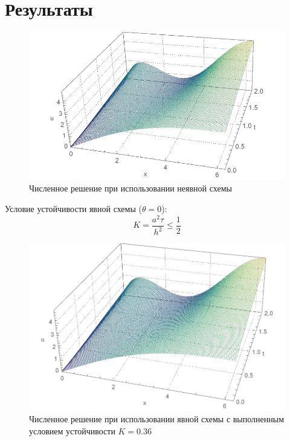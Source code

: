 \documentclass[
11pt,
master, %
subf, %
href, %
colorlinks=true, %
]{disser}
\begin{document}
\section{Результаты}
\begin{figure}[htbp]
  \centering
  \includegraphics[width=1\linewidth]{vis_imp}
  \caption{Численное решение при использовании неявной схемы}\label{}
\end{figure}

Условие устойчивости явной схемы ($\theta = 0$):
$$K = \frac{a^2 \tau}{h^2} \leq \frac{1}{2}$$

\begin{figure}[htbp]
  \centering
  \includegraphics[width=1\linewidth]{vis_exp_1}
  \caption{Численное решение при использовании явной схемы с выполненным условием устойчивости $K = 0.36$}\label{}
\end{figure}
\end{document}
